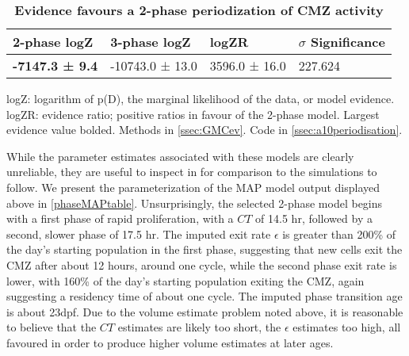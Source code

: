 \begin{table}[!ht]
    \centering
    \caption{{\bf Evidence favours a 2-phase periodization of CMZ activity}}
    \begin{tabular}{|l|l|l|l|} \hline 
        {\bf 2-phase logZ} & {\bf 3-phase logZ} & {\bf logZR} & {\bf $\sigma$ Significance}\\ \hline
        \textbf{-7147.3 ± 9.4} & -10743.0 ± 13.0 & 3596.0 ± 16.0 & 227.624\\ \hline
        \end{tabular}
    \begin{flushleft} logZ: logarithm of p(D), the marginal likelihood of the data, or model evidence. logZR: evidence ratio; positive ratios in favour of the 2-phase model. Largest evidence value bolded.
    Methods in \autoref{ssec:GMCev}.
    Code in \autoref{ssec:a10periodisation}.
    \end{flushleft}
    \label{phasetable}
\end{table}

While the parameter estimates associated with these models are clearly unreliable, they are useful to inspect in for comparison to the simulations to follow. We present the parameterization of the MAP model output displayed above in \autoref{phaseMAPtable}. Unsurprisingly, the selected 2-phase model begins with a first phase of rapid proliferation, with a $CT$ of 14.5 hr, followed by a second, slower phase of 17.5 hr. The imputed exit rate $\epsilon$ is greater than 200\% of the day's starting population in the first phase, suggesting that new cells exit the CMZ after about 12 hours, around one cycle, while the second phase exit rate is lower, with 160\% of the day's starting population exiting the CMZ, again suggesting a residency time of about one cycle. The imputed phase transition age is about 23dpf. Due to the volume estimate problem noted above, it is reasonable to believe that the $CT$ estimates are likely too short, the $\epsilon$ estimates too high, all favoured in order to produce higher volume estimates at later ages.

